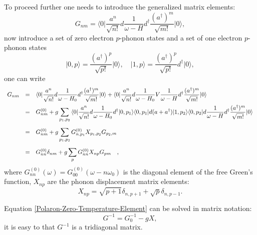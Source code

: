 \documentclass{book}
\newcommand{\bra}[1]{{\langle#1|}}
\newcommand{\ket}[1]{{|#1\rangle}}
\numberwithin{equation}{section}
\begin{document}
To proceed further one needs to introduce the generalized matrix
elements:
\begin{equation}
  G_{nm}=\bra{0}\frac{a^n}{\sqrt{n!}}d\frac{1}{\omega-H}
  d^\dag\frac{(a^\dag)^m}{\sqrt{m!}}\ket{0},
\end{equation}
now introduce a set of zero electron $p$-phonon states and a set of
one electron $p$-phonon states
\begin{equation}
  \ket{0,p}=\frac{(a^\dag)^p}{\sqrt{p!}}\ket{0},
  \quad\ket{1,p}=\frac{(a^\dag)^p}{\sqrt{p!}}d^\dag\ket{0},
\end{equation}
one can write
\begin{equation}
  \begin{array}{rcl}
    G_{nm}&=&\displaystyle\bra{0}\frac{a^n}{\sqrt{n!}}d
    \frac{1}{\omega-H_0}d^\dag\frac{(a^\dag)^m}{\sqrt{m!}}\ket{0}+
    \bra{0}\frac{a^n}{\sqrt{n!}}d\frac{1}{\omega-H_0}V
    \frac{1}{\omega-H}d^\dag\frac{(a^\dag)^m}{\sqrt{m!}}\ket{0}\\\vbox to 20pt{}
    &=&\displaystyle G^{(0)}_{nm}+
    g\sum_{p_1,p_2}\bra{0}\frac{a^n}{\sqrt{n!}}d\frac{1}{\omega-H_0}d^\dag
    \ket{0,p_1}\bra{0,p_1}d(a+a^\dag)\ket{1,p_2}\bra{0,p_2}d
    \frac{1}{\omega-H}d^\dag\frac{(a^\dag)^m}{\sqrt{m!}}\ket{0}\\\vbox to 20pt{}
    &=&\displaystyle G^{(0)}_{nm}+
    g\sum_{p_1,p_2}G^{(0)}_{n,p_1}X_{p_1,p_2}G_{p_2,m}\\\vbox to 20pt{}
    &=&\displaystyle G^{(0)}_{nn}\delta_{nm}+
    g\sum_{p}G^{(0)}_{nn}X_{np}G_{pm}\quad,
  \end{array}
  \label{Polaron-Zero-Temperature-Element}
\end{equation}
where $G^{(0)}_{nn}(\omega)=G^{(0)}_{00}(\omega-n\omega_0)$ is the diagonal
element of the free Green's function, $X_{np}$ are the phonon
displacement matrix elements:
\begin{equation}
  X_{np}=\sqrt{p+1}\delta_{n,p+1}+\sqrt{p}\delta_{n,p-1}.
\end{equation}

Equation \eqref{Polaron-Zero-Temperature-Element} can be solved in
matrix notation:
\begin{equation}
  G^{-1}=G_0^{-1}-gX,
\end{equation}
it is easy to that $G^{-1}$ is a tridiagonal matrix.
\end{document}
